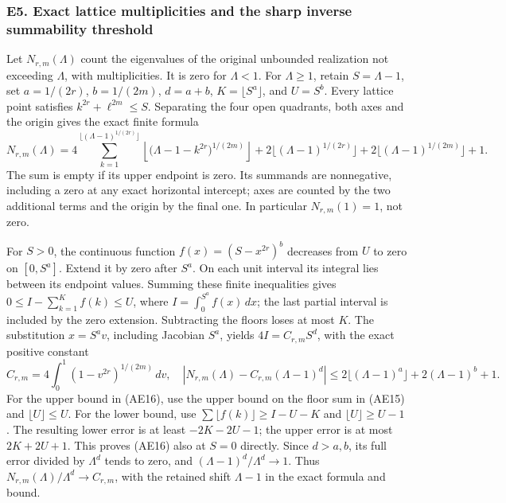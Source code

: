 \documentclass[
  11pt,
]{article}
\begin{document}
\subsubsection{E5. Exact lattice multiplicities and the sharp inverse
summability
threshold}\label{e5.-exact-lattice-multiplicities-and-the-sharp-inverse-summability-threshold}

Let \(N_{r,m}(\Lambda)\) count the eigenvalues of the original unbounded
realization not exceeding \(\Lambda\), with multiplicities. It is zero
for \(\Lambda<1\). For \(\Lambda\geq1\), retain \(S=\Lambda-1\), set
\(a=1/(2r)\), \(b=1/(2m)\), \(d=a+b\), \(K=\lfloor S^a\rfloor\), and
\(U=S^b\). Every lattice point satisfies \(k^{2r}+\ell^{2m}\leq S\).
Separating the four open quadrants, both axes and the origin gives the
exact finite formula \[
 N_{r,m}(\Lambda)=
 4\sum_{k=1}^{\lfloor(\Lambda-1)^{1/(2r)}\rfloor}
   \left\lfloor\bigl(\Lambda-1-k^{2r}\bigr)^{1/(2m)}\right\rfloor
 +2\lfloor(\Lambda-1)^{1/(2r)}\rfloor
 +2\lfloor(\Lambda-1)^{1/(2m)}\rfloor+1.
 \tag{AE15}
\] The sum is empty if its upper endpoint is zero. Its summands are
nonnegative, including a zero at any exact horizontal intercept; axes
are counted by the two additional terms and the origin by the final one.
In particular \(N_{r,m}(1)=1\), not zero.

For \(S>0\), the continuous function \(f(x)=(S-x^{2r})^b\) decreases
from \(U\) to zero on \([0,S^a]\). Extend it by zero after \(S^a\). On
each unit interval its integral lies between its endpoint values.
Summing these finite inequalities gives
\(0\leq I-\sum_{k=1}^K f(k)\leq U\), where \(I=\int_0^{S^a}f(x)\,dx\);
the last partial interval is included by the zero extension. Subtracting
the floors loses at most \(K\). The substitution \(x=S^a v\), including
Jacobian \(S^a\), yields \(4I=C_{r,m}S^d\), with the exact positive
constant \[
 C_{r,m}=4\int_0^1(1-v^{2r})^{1/(2m)}\,dv,
 \quad
 \left|N_{r,m}(\Lambda)-C_{r,m}(\Lambda-1)^d\right|
  \leq2\lfloor(\Lambda-1)^a\rfloor+2(\Lambda-1)^b+1.
 \tag{AE16}
\] For the upper bound in (AE16), use the upper bound on the floor sum
in (AE15) and \(\lfloor U\rfloor\leq U\). For the lower bound, use
\(\sum\lfloor f(k)\rfloor\geq I-U-K\) and \(\lfloor U\rfloor\geq U-1\).
The resulting lower error is at least \(-2K-2U-1\); the upper error is
at most \(2K+2U+1\). This proves (AE16) also at \(S=0\) directly. Since
\(d>a,b\), its full error divided by \(\Lambda^d\) tends to zero, and
\((\Lambda-1)^d/\Lambda^d\to1\). Thus
\(N_{r,m}(\Lambda)/\Lambda^d\to C_{r,m}\), with the retained shift
\(\Lambda-1\) in the exact formula and bound.
\end{document}
